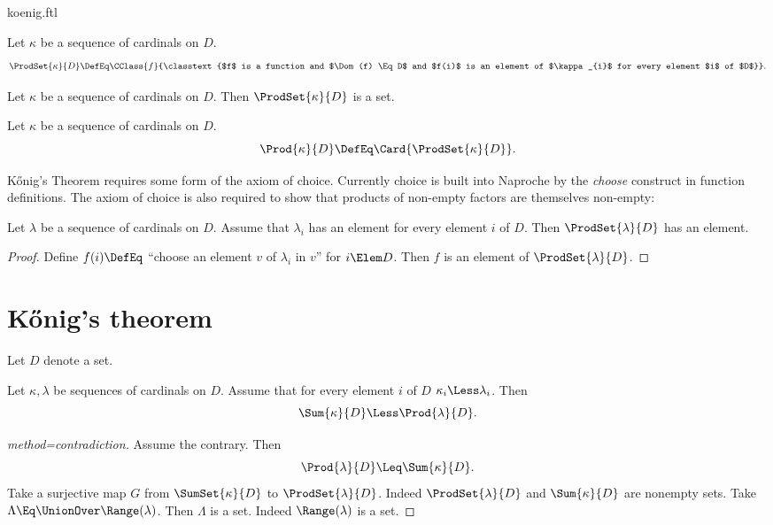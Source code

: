 \documentclass{stex}
\begin{document}
\begin{smodule}{koenig.ftl}
\begin{forthel}
  \begin{definition*}[for=ProdSet]
    Let $\kappa$ be a sequence of cardinals on $D$.
    \[ \ProdSet{\kappa}{D} \DefEq \CClass{f}{\classtext{$f$ is a function and $\Dom(f) \Eq D$ and $f(i)$ is an element of $\kappa_{i}$ for every element $i$ of $D$}}. \]
  \end{definition*}

  \begin{axiom*}
    Let $\kappa$ be a sequence of cardinals on $D$.
    Then $\ProdSet{\kappa}{D}$ is a set.
  \end{axiom*}

  \begin{definition*}[for=Prod]
    Let $\kappa$ be a sequence of cardinals on $D$.
    \[ \Prod{\kappa}{D} \DefEq \Card{ \ProdSet{\kappa}{D} }. \]
  \end{definition*}
\end{forthel}

Kőnig's Theorem requires some form of the axiom of choice.
Currently choice is built into Naproche by the \emph{choose} construct in
function definitions.
The axiom of choice is also required to show that products of non-empty factors
are themselves non-empty:

\begin{forthel}
  \begin{lemma*}[title=Choice]
    Let $\lambda$ be a sequence of cardinals on $D$.
    Assume that $\lambda_{i}$ has an element for every element $i$ of $D$.
    Then $\ProdSet{\lambda}{D}$ has an element.
  \end{lemma*}
  \begin{proof}
    Define $f(i) \DefEq$ ``choose an element $v$ of $\lambda_{i}$ in $v$'' for $i \Elem D$.
    Then $f$ is an element of $\ProdSet{\lambda}{D}$.
  \end{proof}
\end{forthel}


\section*{Kőnig's theorem}

\begin{forthel}
  Let $D$ denote a set.

  \begin{theorem*}[title=Kőnig,name=Koenig]
    Let $\kappa, \lambda$ be sequences of cardinals on $D$.
    Assume that for every element $i$ of $D$ $\kappa_{i} \Less \lambda_{i}$.
    Then \[ \Sum{\kappa}{D} \Less \Prod{\lambda}{D}. \]
  \end{theorem*}
  \begin{proof}[method=contradiction]
    Assume the contrary.
    Then \[ \Prod{\lambda}{D} \Leq \Sum{\kappa}{D}. \]
    Take a surjective map $G$ from $\SumSet{\kappa}{D}$ to $\ProdSet{\lambda}{D}$.
    Indeed $\ProdSet{\lambda}{D}$ and $\Sum{\kappa}{D}$ are nonempty sets.
    Take $\Lambda \Eq \UnionOver \Range(\lambda)$.
    Then $\Lambda$ is a set.
    Indeed $\Range(\lambda)$ is a set.


\end{proof}
\end{forthel}
\end{smodule}
\end{document}
